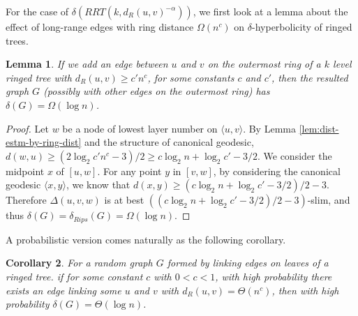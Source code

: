 \documentclass[11pt]{article}
\newtheorem{lem}{Lemma}
\newtheorem{coro}[lem]{Corollary}
\begin{document}



For the case of $\delta(RRT(k,d_R(u,v)^{-\alpha}))$, 
	we first look at a lemma about the effect of long-range edges
	with ring distance $\Omega(n^c)$ 
	on $\delta$-hyperbolicity of ringed trees.

\begin{lem} \label{lem:large-jumping}
If we add an edge between $u$ and $v$ 
	on the outermost ring of a $k$ level ringed tree with 
	$d_R(u,v) \geq c'n^{c}$, for some constants $c$ and $c'$,
	then the resulted graph $G$ (possibly with other edges on the outermost 
	ring) has $\delta(G) = \Omega(\log n)$.
\end{lem}

\begin{proof}
Let $w$ be a node of lowest layer number on $\langle u,v \rangle$. 
By Lemma \ref{lem:dist-estm-by-ring-dist} and the structure of canonical geodesic, 
	$d(w,u) \geq (2\log_2 c'n^c - 3)/2 \geq c\log_2 n + \log_2 c' - 3/2$. We consider the midpoint $x$ of $[u,w]$. For any point $y$ in $[v,w]$, 
	by considering the canonical geodesic 
	$\langle x,y \rangle$, we know that $d(x,y) \geq (c\log_2 n + \log_2 c' - 3/2) / 2 - 3$. 
Therefore $\Delta(u,v,w)$ is at best $((c\log_2 n + \log_2 c' - 3/2) / 2 - 3)$-slim, and thus $\delta(G) = \delta_{Rips}(G) = \Omega(\log n)$.
\end{proof}

A probabilistic version comes naturally as the following corollary.

\begin{coro} \label{coro:large-jumping}
For a random graph $G$ formed by linking edges on leaves of a ringed tree.
	if for some constant $c$ with $0 < c < 1$, 
	with high probability there exists an edge linking some $u$ and 
	$v$ with $d_R(u,v)=\Theta(n^c)$, 
	then with high probability $\delta(G)=\Theta(\log n)$.
\end{coro}
\end{document}

